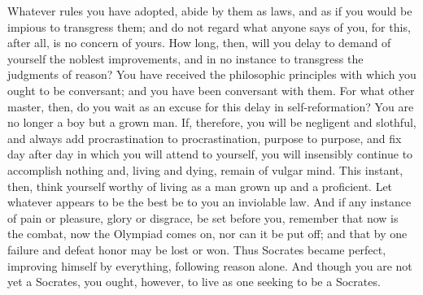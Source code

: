 Whatever rules you have adopted, abide by them  as laws, and as if you would be
impious to  transgress them;  and do not  regard what anyone  says of  you, for
this, after  all, is no  concern of  yours. How long,  then, will you  delay to
demand of yourself  the noblest improvements, and in no  instance to transgress
the  judgments of  reason? You  have received  the philosophic  principles with
which you ought to  be conversant; and you have been  conversant with them. For
what  other  master,  then,  do  you  wait as  an  excuse  for  this  delay  in
self-reformation?  You are  no longer  a boy  but a  grown man.  If, therefore,
you  will  be  negligent  and  slothful,  and  always  add  procrastination  to
procrastination, purpose  to purpose, and fix  day after day in  which you will
attend to  yourself, you  will insensibly continue  to accomplish  nothing and,
living and  dying, remain of  vulgar mind.  This instant, then,  think yourself
worthy of living as a man grown up and a proficient. Let whatever appears to be
the best be to you an inviolable law.  And if any instance of pain or pleasure,
glory or disgrace, be set before you,  remember that now is the combat, now the
Olympiad comes on,  nor can it be put  off; and that by one  failure and defeat
honor may  be lost or won.  Thus Socrates became perfect,  improving himself by
everything, following reason alone. And though  you are not yet a Socrates, you
ought, however, to live as one seeking to be a Socrates.
